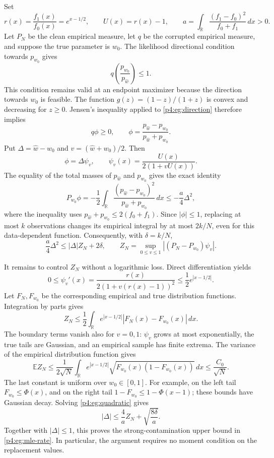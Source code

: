\documentclass[11pt,a4paper]{article}
\theoremstyle{definition}
\theoremstyle{remark}
\numberwithin{equation}{section}
\begin{document}
Set
\[
 r(x)=\frac{f_1(x)}{f_0(x)}=e^{x-1/2},
 \qquad U(x)=r(x)-1,\qquad
 a=\int_{\mathbb R}\frac{(f_1-f_0)^2}{f_0+f_1}\,dx>0.
\]
Let $P_N$ be the clean empirical measure, let $q$ be the corrupted
empirical measure, and suppose the true parameter is $w_0$.
The likelihood directional condition towards $p_{w_0}$ gives
\begin{equation}\label{p4:eg:direction}
 q\left(\frac{p_{w_0}}{p_{\widehat w}}\right)\le1.
\end{equation}
This condition remains valid at an endpoint maximizer because the
direction towards $w_0$ is feasible. The function
$g(z)=(1-z)/(1+z)$ is convex and decreasing for $z\ge0$.
Jensen's inequality applied to \eqref{p4:eg:direction} therefore implies
\[
 q\phi\ge0,\qquad
 \phi=\frac{p_{\widehat w}-p_{w_0}}{p_{\widehat w}+p_{w_0}}.
\]
Put $\Delta=\widehat w-w_0$ and $v=(\widehat w+w_0)/2$.
Then
\[
 \phi=\Delta\psi_v,\qquad
 \psi_v(x)=\frac{U(x)}{2(1+vU(x))}.
\]
The equality of the total masses of $p_{\widehat w}$ and $p_{w_0}$
gives the exact identity
\[
 P_{w_0}\phi
 =-\frac12\int_{\mathbb R}
       \frac{(p_{\widehat w}-p_{w_0})^2}
            {p_{\widehat w}+p_{w_0}}\,dx
 \le-\frac a4\Delta^2,
\]
where the inequality uses
$p_{\widehat w}+p_{w_0}\le2(f_0+f_1)$.
Since $|\phi|\le1$, replacing at most $k$ observations changes its
empirical integral by at most $2k/N$, even for this data-dependent
function. Consequently, with $\delta=k/N$,
\begin{equation}\label{p4:eg:quadratic}
 \frac a4\Delta^2\le |\Delta|Z_N+2\delta,\qquad
 Z_N=\sup_{0\le v\le1}|(P_N-P_{w_0})\psi_v|.
\end{equation}

It remains to control $Z_N$ without a logarithmic loss. Direct
differentiation yields
\[
 0\le\psi_v'(x)=\frac{r(x)}{2(1+v(r(x)-1))^2}
       \le\frac12e^{|x-1/2|}.
\]
Let $F_N,F_{w_0}$ be the corresponding empirical and true distribution
functions. Integration by parts gives
\[
 Z_N\le\frac12\int_{\mathbb R}
           e^{|x-1/2|}|F_N(x)-F_{w_0}(x)|\,dx.
\]
The boundary terms vanish also for $v=0,1$: $\psi_v$ grows at most
exponentially, the true tails are Gaussian, and an empirical sample
has finite extrema. The variance of the empirical distribution
function gives
\begin{equation}\label{p4:eg:empirical}
 \mathbb EZ_N\le\frac1{2\sqrt N}
 \int_{\mathbb R}e^{|x-1/2|}
       \sqrt{F_{w_0}(x)(1-F_{w_0}(x))}\,dx
 \le\frac{C_0}{\sqrt N}.
\end{equation}
The last constant is uniform over $w_0\in[0,1]$. For example, on the
left tail $F_{w_0}\le\Phi(x)$, and on the right tail
$1-F_{w_0}\le1-\Phi(x-1)$; these bounds have Gaussian decay.
Solving \eqref{p4:eg:quadratic} gives
\begin{equation}\label{p4:eg:pathwise}
 |\Delta|\le\frac4a Z_N+\sqrt{\frac{8\delta}{a}}.
\end{equation}
Together with $|\Delta|\le1$, this proves the strong-contamination
upper bound in \eqref{p4:eg:mle-rate}. In particular, the argument
requires no moment condition on the replacement values.
\end{document}
